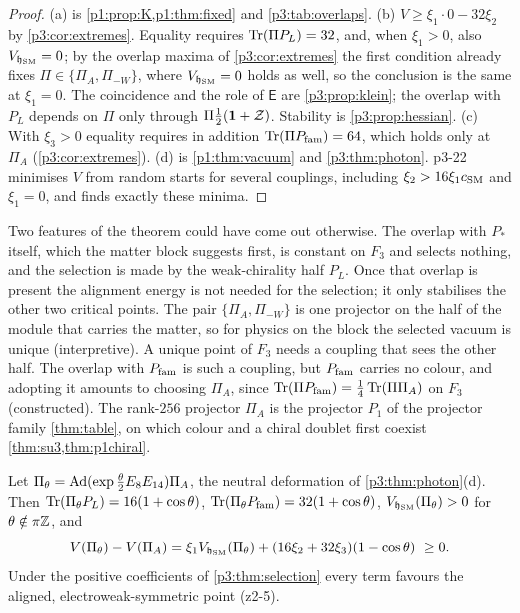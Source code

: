 \begin{proof}
(a) is \cref{p1:prop:K,p1:thm:fixed} and \cref{p3:tab:overlaps}. (b) $V\ge\xi_1\cdot0-32\xi_2$ by \cref{p3:cor:extremes}. Equality requires $\operatorname{Tr}(\Pi P_L)=32$, and, when
$\xi_1>0$, also $V_{\mathfrak h_{\rm SM}}=0$; by the overlap maxima of \cref{p3:cor:extremes} the first condition already fixes $\Pi\in\{\Pi_A,\Pi_{-W}\}$, where
$V_{\mathfrak h_{\rm SM}}=0$ holds as well, so the conclusion is the same at $\xi_1=0$. The coincidence and the role of $\mathsf E$ are \cref{p3:prop:klein}; the overlap with $P_L$
depends on $\Pi$ only through $\Pi\tfrac12(\mathbf 1+\mathcal Z)$. Stability is \cref{p3:prop:hessian}. (c) With $\xi_3>0$ equality requires in addition $\operatorname{Tr}(\Pi P_{\rm fam})=64$, which holds only at
$\Pi_A$ (\cref{p3:cor:extremes}). (d) is \cref{p1:thm:vacuum} and \cref{p3:thm:photon}. p3-22 minimises $V$ from random starts for several couplings, including
$\xi_2>16\xi_1 c_{\rm SM}$ and $\xi_1=0$, and finds exactly these minima.
\end{proof}

Two features of the theorem could have come out otherwise. The overlap with $P_*$ itself, which the matter block suggests first, is constant on $F_3$ and selects nothing,
and the selection is made by the weak-chirality half $P_L$. Once that overlap is present the alignment energy is not needed for the selection; it only stabilises the
other two critical points. The pair $\{\Pi_A,\Pi_{-W}\}$ is one projector on the half of the module that carries the matter, so for physics on the block the selected
vacuum is unique (interpretive). A unique point of $F_3$ needs a coupling that sees the other half. The overlap with $P_{\rm fam}$ is such a coupling, but $P_{\rm fam}$ carries no colour,
and adopting it amounts to choosing $\Pi_A$, since $\operatorname{Tr}(\Pi P_{\rm fam})=\tfrac14\operatorname{Tr}(\Pi\Pi_A)$ on $F_3$ (constructed). The rank-$256$ projector $\Pi_A$ is the projector $P_1$ of the
projector family \cref{thm:table}, on which colour and a chiral doublet first coexist \cref{thm:su3,thm:p1chiral}.

\begin{proposition}
\label{p3:prop:neutral}
Let $\Pi_\theta=\operatorname{Ad}(\exp\tfrac\theta2E_8E_{14})\Pi_A$, the neutral deformation of \cref{p3:thm:photon}(d). Then $\operatorname{Tr}(\Pi_\theta P_L)=16(1+\cos\theta)$,
$\operatorname{Tr}(\Pi_\theta P_{\rm fam})=32(1+\cos\theta)$, $V_{\mathfrak h_{\rm SM}}(\Pi_\theta)>0$ for $\theta\notin\pi\mathbb{Z}$, and
\[
V(\Pi_\theta)-V(\Pi_A)=\xi_1 V_{\mathfrak h_{\rm SM}}(\Pi_\theta)+(16\xi_2+32\xi_3)(1-\cos\theta)\ \ge0 .
\]
Under the positive coefficients of \cref{p3:thm:selection} every term favours the aligned, electroweak-symmetric point (z2-5).
\end{proposition}

